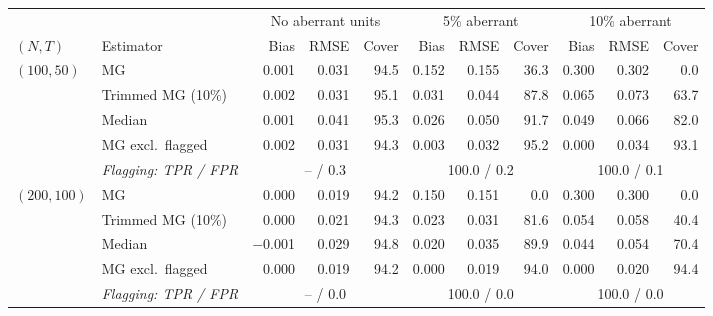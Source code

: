 \begin{tabular}{llrrrrrrrrr}
\toprule
 & & \multicolumn{3}{c}{No aberrant units} & \multicolumn{3}{c}{5\% aberrant} & \multicolumn{3}{c}{10\% aberrant} \\
\cmidrule(lr){3-5}\cmidrule(lr){6-8}\cmidrule(lr){9-11}
$(N,T)$ & Estimator & Bias & RMSE & Cover & Bias & RMSE & Cover & Bias & RMSE & Cover \\
\midrule
$(100,50)$ & MG & 0.001 & 0.031 & 94.5 & 0.152 & 0.155 & 36.3 & 0.300 & 0.302 & 0.0 \\
 & Trimmed MG (10\%) & 0.002 & 0.031 & 95.1 & 0.031 & 0.044 & 87.8 & 0.065 & 0.073 & 63.7 \\
 & Median & 0.001 & 0.041 & 95.3 & 0.026 & 0.050 & 91.7 & 0.049 & 0.066 & 82.0 \\
 & MG excl.\ flagged & 0.002 & 0.031 & 94.3 & 0.003 & 0.032 & 95.2 & 0.000 & 0.034 & 93.1 \\
 & \emph{Flagging: TPR / FPR} & \multicolumn{3}{c}{-- / 0.3} & \multicolumn{3}{c}{100.0 / 0.2} & \multicolumn{3}{c}{100.0 / 0.1} \\
\addlinespace
$(200,100)$ & MG & 0.000 & 0.019 & 94.2 & 0.150 & 0.151 & 0.0 & 0.300 & 0.300 & 0.0 \\
 & Trimmed MG (10\%) & 0.000 & 0.021 & 94.3 & 0.023 & 0.031 & 81.6 & 0.054 & 0.058 & 40.4 \\
 & Median & $-$0.001 & 0.029 & 94.8 & 0.020 & 0.035 & 89.9 & 0.044 & 0.054 & 70.4 \\
 & MG excl.\ flagged & 0.000 & 0.019 & 94.2 & 0.000 & 0.019 & 94.0 & 0.000 & 0.020 & 94.4 \\
 & \emph{Flagging: TPR / FPR} & \multicolumn{3}{c}{-- / 0.0} & \multicolumn{3}{c}{100.0 / 0.0} & \multicolumn{3}{c}{100.0 / 0.0} \\
\bottomrule
\end{tabular}
